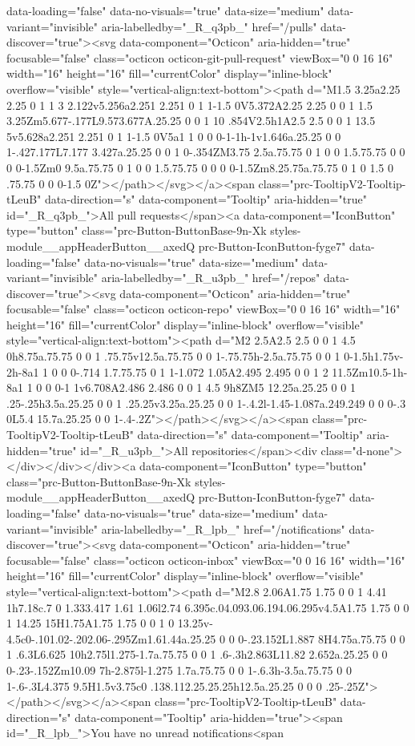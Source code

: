 data-loading="false" data-no-visuals="true" data-size="medium" data-variant="invisible" aria-labelledby="_R_q3pb_" href="/pulls" data-discover="true"><svg data-component="Octicon" aria-hidden="true" focusable="false" class="octicon octicon-git-pull-request" viewBox="0 0 16 16" width="16" height="16" fill="currentColor" display="inline-block" overflow="visible" style="vertical-align:text-bottom"><path d="M1.5 3.25a2.25 2.25 0 1 1 3 2.122v5.256a2.251 2.251 0 1 1-1.5 0V5.372A2.25 2.25 0 0 1 1.5 3.25Zm5.677-.177L9.573.677A.25.25 0 0 1 10 .854V2.5h1A2.5 2.5 0 0 1 13.5 5v5.628a2.251 2.251 0 1 1-1.5 0V5a1 1 0 0 0-1-1h-1v1.646a.25.25 0 0 1-.427.177L7.177 3.427a.25.25 0 0 1 0-.354ZM3.75 2.5a.75.75 0 1 0 0 1.5.75.75 0 0 0 0-1.5Zm0 9.5a.75.75 0 1 0 0 1.5.75.75 0 0 0 0-1.5Zm8.25.75a.75.75 0 1 0 1.5 0 .75.75 0 0 0-1.5 0Z"></path></svg></a><span class="prc-TooltipV2-Tooltip-tLeuB" data-direction="s" data-component="Tooltip" aria-hidden="true" id="_R_q3pb_">All pull requests</span><a data-component="IconButton" type="button" class="prc-Button-ButtonBase-9n-Xk styles-module__appHeaderButton__axedQ prc-Button-IconButton-fyge7" data-loading="false" data-no-visuals="true" data-size="medium" data-variant="invisible" aria-labelledby="_R_u3pb_" href="/repos" data-discover="true"><svg data-component="Octicon" aria-hidden="true" focusable="false" class="octicon octicon-repo" viewBox="0 0 16 16" width="16" height="16" fill="currentColor" display="inline-block" overflow="visible" style="vertical-align:text-bottom"><path d="M2 2.5A2.5 2.5 0 0 1 4.5 0h8.75a.75.75 0 0 1 .75.75v12.5a.75.75 0 0 1-.75.75h-2.5a.75.75 0 0 1 0-1.5h1.75v-2h-8a1 1 0 0 0-.714 1.7.75.75 0 1 1-1.072 1.05A2.495 2.495 0 0 1 2 11.5Zm10.5-1h-8a1 1 0 0 0-1 1v6.708A2.486 2.486 0 0 1 4.5 9h8ZM5 12.25a.25.25 0 0 1 .25-.25h3.5a.25.25 0 0 1 .25.25v3.25a.25.25 0 0 1-.4.2l-1.45-1.087a.249.249 0 0 0-.3 0L5.4 15.7a.25.25 0 0 1-.4-.2Z"></path></svg></a><span class="prc-TooltipV2-Tooltip-tLeuB" data-direction="s" data-component="Tooltip" aria-hidden="true" id="_R_u3pb_">All repositories</span><div class="d-none"></div></div></div><a data-component="IconButton" type="button" class="prc-Button-ButtonBase-9n-Xk styles-module__appHeaderButton__axedQ prc-Button-IconButton-fyge7" data-loading="false" data-no-visuals="true" data-size="medium" data-variant="invisible" aria-labelledby="_R_lpb_" href="/notifications" data-discover="true"><svg data-component="Octicon" aria-hidden="true" focusable="false" class="octicon octicon-inbox" viewBox="0 0 16 16" width="16" height="16" fill="currentColor" display="inline-block" overflow="visible" style="vertical-align:text-bottom"><path d="M2.8 2.06A1.75 1.75 0 0 1 4.41 1h7.18c.7 0 1.333.417 1.61 1.06l2.74 6.395c.04.093.06.194.06.295v4.5A1.75 1.75 0 0 1 14.25 15H1.75A1.75 1.75 0 0 1 0 13.25v-4.5c0-.101.02-.202.06-.295Zm1.61.44a.25.25 0 0 0-.23.152L1.887 8H4.75a.75.75 0 0 1 .6.3L6.625 10h2.75l1.275-1.7a.75.75 0 0 1 .6-.3h2.863L11.82 2.652a.25.25 0 0 0-.23-.152Zm10.09 7h-2.875l-1.275 1.7a.75.75 0 0 1-.6.3h-3.5a.75.75 0 0 1-.6-.3L4.375 9.5H1.5v3.75c0 .138.112.25.25.25h12.5a.25.25 0 0 0 .25-.25Z"></path></svg></a><span class="prc-TooltipV2-Tooltip-tLeuB" data-direction="s" data-component="Tooltip" aria-hidden="true"><span id="_R_lpb_">You have no unread notifications<span 